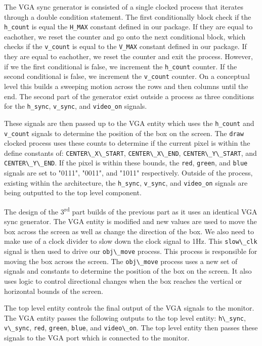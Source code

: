 \documentclass{article}
\newcommand{\code}[1]{\lstinline|#1|}
\begin{document}
The VGA sync generator is consisted of a single clocked process that iterates through a double condition statement. The first conditionally block check if the \code{h_count} is equal the \code{H_MAX} constant defined in our package. If they are equal to eachother, we reset the counter and go onto the next conditional block, which checks if the \code{v_count} is equal to the \code{V_MAX} constant defined in our package. If they are equal to eachother, we reset the counter and exit the process. However, if we the first conditional is false, we increment the \code{h_count} counter. If the second conditional is false, we increment the \code{v_count} counter. On a conceptual level this builds a sweeping motion across the rows and then columns until the end. The second part of the generator exist outside a process as three conditions for the \code{h_sync}, \code{v_sync}, and \code{video_on} signals.

These signals are then passed up to the VGA entity which uses the \code{h_count} and \code{v_count} signals to determine the position of the box on the screen. The \code{draw} clocked process uses these counts to determine if the current pixel is within the define constants of: \code{CENTER\_X\_START}, \code{CENTER\_X\_END}, \code{CENTER\_Y\_START}, and \code{CENTER\_Y\_END}. If the pixel is within these bounds, the \code{red}, \code{green}, and \code{blue} signals are set to "0111", "0011", and "1011" respectively. Outside of the process, existing within the architecture, the \code{h_sync}, \code{v_sync}, and \code{video_on} signals are being outputted to the top level component.

The design of the 3\textsuperscript{rd} part builds of the previous part as it uses an identical VGA sync generator. The VGA entity is modified and new values are used to move the box across the screen as well as change the direction of the box. We also need to make use of a clock divider to slow down the clock signal to 1Hz. This \code{slow\_clk} signal is then used to drive our \code{obj\_move} process. This process is responsible for moving the box across the screen. The \code{obj\_move} process uses a new set of signals and constants to determine the position of the box on the screen. It also uses logic to control directional changes when the box reaches the vertical or horizontal bounds of the screen.

The top level entity controls the final output of the VGA signals to the monitor. The VGA entity passes the following outputs to the top level entity: \code{h\_sync}, \code{v\_sync}, \code{red}, \code{green}, \code{blue}, and \code{video\_on}. The top level entity then passes these signals to the VGA port which is connected to the monitor. 
\end{document}
